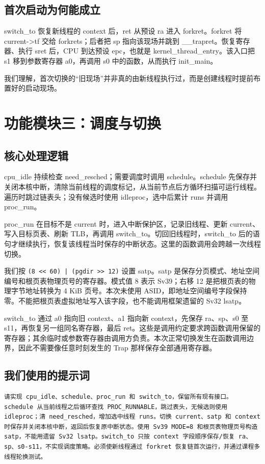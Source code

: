 \documentclass[UTF8,a4paper,10pt]{ctexart}
\begin{document}
\subsection{首次启动为何能成立}

switch\_to 恢复新线程的 context 后，ret 从预设 ra 进入 forkret。forkret 将 current->tf 交给 forkrets；后者把 sp 指向该现场并跳到 \_\_trapret。恢复寄存器、执行 sret 后，CPU 到达预设 epc，也就是 kernel\_thread\_entry。该入口把 s1 移到参数寄存器 a0，再调用 s0 中的函数，从而执行 init\_main。


我们理解，首次切换的“旧现场”并非真的由新线程执行过，而是创建线程时提前布置好的启动现场。


\section{功能模块三：调度与切换}

\subsection{核心处理逻辑}

cpu\_idle 持续检查 need\_resched；需要调度时调用 schedule。schedule 先保存并关闭本核中断，清除当前线程的调度标记，从当前节点后方循环扫描可运行线程。遍历时跳过链表头；没有候选时使用 idleproc，选中后累计 runs 并调用 proc\_run。


proc\_run 在目标不是 current 时，进入中断保护区，记录旧线程、更新 current、写入目标页表、刷新 TLB，再调用 switch\_to。切回旧线程时，switch\_to 后的语句才继续执行，恢复该线程当时保存的中断状态。这里的函数调用会跨越一次线程切换。


我们按 \nolinkurl{(8 << 60) | (pgdir >> 12)} 设置 satp。satp 是保存分页模式、地址空间编号和根页表物理页号的寄存器。模式值 8 表示 Sv39；右移 12 是把根页表的物理字节地址转换为 4 KiB 页号。本次未使用 ASID，即地址空间编号字段保持零。不能把根页表虚拟地址写入该字段，也不能调用框架遗留的 Sv32 lsatp。


switch\_to 通过 a0 指向旧 context、a1 指向新 context，先保存 ra、sp、s0 至 s11，再恢复另一组同名寄存器，最后 ret。这些是调用约定要求跨函数调用保留的寄存器；其余临时或参数寄存器由调用方负责。本次正常切换发生在函数调用边界，因此不需要像任意时刻发生的 Trap 那样保存全部通用寄存器。


\subsection{我们使用的提示词}

\begin{lstlisting}
请实现 cpu_idle、schedule、proc_run 和 switch_to，保留所有现有接口。schedule 从当前线程之后循环查找 PROC_RUNNABLE，跳过表头，无候选则使用 idleproc；清 need_resched，增加选中线程 runs。切换 current、satp 和 context 时保存并关闭本核中断，返回后恢复原中断状态。使用 Sv39 MODE=8 和根页表物理页号构造 satp，不能用遗留 Sv32 lsatp。switch_to 只按 context 字段顺序保存/恢复 ra、sp、s0-s11，不实现调度策略。必须使新线程通过 forkret 恢复链首次运行，并通过课程多线程轮换测试。
\end{lstlisting}
\end{document}
